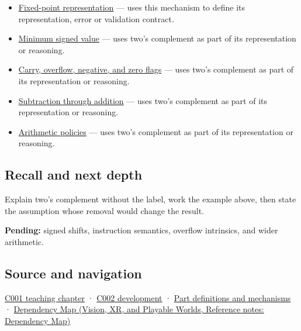 \begin{itemize}
\item
  \hyperref[appendix-1d0dbe8924cc]{Fixed-point representation} --- uses this mechanism to define its representation, error or validation contract.
\item
  \hyperref[appendix-05f39b10364d]{Minimum signed value} --- uses two's complement as part of its representation or reasoning.
\item
  \hyperref[appendix-8d687c9c08ab]{Carry, overflow, negative, and zero flags} --- uses two's complement as part of its representation or reasoning.
\item
  \hyperref[appendix-1c7df340573e]{Subtraction through addition} --- uses two's complement as part of its representation or reasoning.
\item
  \hyperref[appendix-2ed044358b82]{Arithmetic policies} --- uses two's complement as part of its representation or reasoning.
\end{itemize}

\subsection{Recall and next depth}\label{appendix-4fbc03d20829-recall-and-next-depth}

Explain two's complement without the label, work the example above, then state the assumption whose removal would change the result.

\textbf{Pending:} signed shifts, instruction semantics, overflow intrinsics, and wider arithmetic.

\subsection{Source and navigation}\label{appendix-4fbc03d20829-source-and-navigation}

\hyperref[01-foundations-i-ch001-from-a-signal-to-an-interpretation]{C001 teaching chapter} · \hyperref[01-foundations-i-ch001-arithmetic-becomes-a-policy]{C002 development} · \hyperref[appendix-fd090d982a15]{Part definitions and mechanisms} · \href{../07-Vision-XR-and-Playable-Worlds/main.pdf\#nameddest=appendix-4ad47bdd269a}{Dependency Map (Vision, XR, and Playable Worlds, Reference notes: Dependency Map)}
